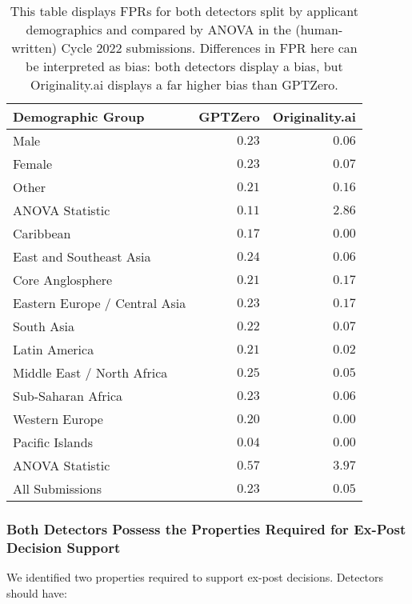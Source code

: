 \begin{table*}[htbp]
  \centering
  \caption{This table displays FPRs for both detectors split by applicant demographics and compared by ANOVA in the (human-written) Cycle 2022 submissions. Differences in FPR here can be interpreted as bias: both detectors display a bias, but Originality.ai displays a far higher bias than GPTZero.}
  \label{tab:demo_means_c2}
  \begin{tabular}{l r r}
      \toprule
      Demographic Group & GPTZero & Originality.ai \\
      \midrule
      Male                    & $0.23$ & $0.06$ \\
      Female                  & $0.23$ & $0.07$ \\
      Other                   & $0.21$ & $0.16$ \\
      ANOVA Statistic         & $\mathbf{0.11}$ & $\mathbf{2.86}$ \\
      \midrule
      Caribbean               & $0.17$ & $0.00$ \\
      East and Southeast Asia     & $0.24$ & $0.06$ \\
      Core Anglosphere               & $0.21$ & $0.17$ \\
      Eastern Europe / Central Asia    & $0.23$ & $0.17$ \\
      South Asia     & $0.22$ & $0.07$ \\
      Latin America           & $0.21$ & $0.02$ \\
      Middle East / North Africa   & $0.25$ & $0.05$ \\
      Sub-Saharan Africa      & $0.23$ & $0.06$ \\
      Western Europe            & $0.20$ & $0.00$ \\
      Pacific Islands         & $0.04$ & $0.00$ \\
      ANOVA Statistic         & $\mathbf{0.57}$ & $\mathbf{3.97}$ \\
      \midrule
      All Submissions         & $0.23$ & $0.05$ \\
      \bottomrule
  \end{tabular}
\end{table*}

\subsubsection{Both Detectors Possess the Properties Required for Ex-Post Decision Support}
We identified two properties required to support ex-post decisions. Detectors should have:

